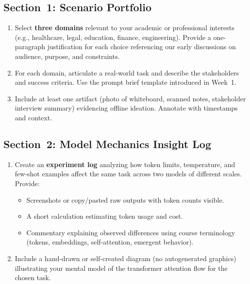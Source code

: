 \documentclass[11pt]{article}
\begin{document}
\subsection{Section~1: Scenario Portfolio}
\begin{enumerate}[label=1.\arabic*]
    \item Select \textbf{three domains} relevant to your academic or professional interests (e.g., healthcare, legal, education, finance, engineering). Provide a one-paragraph justification for each choice referencing our early discussions on audience, purpose, and constraints.
    \item For each domain, articulate a real-world task and describe the stakeholders and success criteria. Use the prompt brief template introduced in Week~1.
    \item Include at least one artifact (photo of whiteboard, scanned notes, stakeholder interview summary) evidencing offline ideation. Annotate with timestamps and context.
\end{enumerate}

\subsection{Section~2: Model Mechanics Insight Log}
\begin{enumerate}[label=2.\arabic*]
    \item Create an \textbf{experiment log} analyzing how token limits, temperature, and few-shot examples affect the same task across two models of different scales. Provide:
    \begin{itemize}
        \item Screenshots or copy/pasted raw outputs with token counts visible.
        \item A short calculation estimating token usage and cost.
    \item Commentary explaining observed differences using course terminology (tokens, embeddings, self-attention, emergent behavior).
    \end{itemize}
    \item Include a hand-drawn or self-created diagram (no autogenerated graphics) illustrating your mental model of the transformer attention flow for the chosen task.
\end{enumerate}
\end{document}
